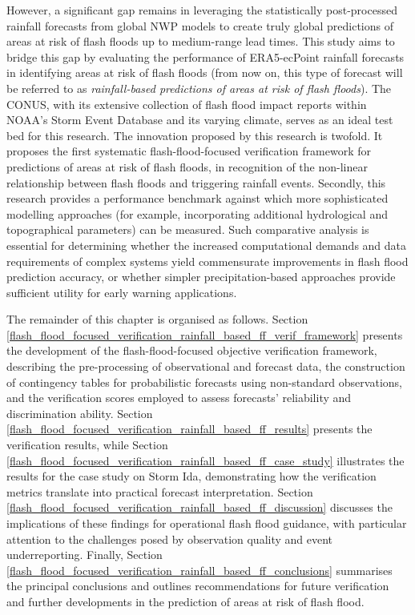 However,  a significant gap remains in leveraging the statistically post-processed rainfall forecasts from global NWP models to create truly global predictions of areas at risk of flash floods up to medium-range lead times. This study aims to bridge this gap by evaluating the performance of ERA5-ecPoint rainfall forecasts in identifying areas at risk of flash floods (from now on, this type of forecast will be referred to as \textit{rainfall-based predictions of areas at risk of flash floods}). The CONUS, with its extensive collection of flash flood impact reports within NOAA's Storm Event Database and its varying climate, serves as an ideal test bed for this research. The innovation proposed by this research is twofold. It proposes the first systematic flash-flood-focused verification framework for predictions of areas at risk of flash floods, in recognition of the non-linear relationship between flash floods and triggering rainfall events. Secondly, this research provides a performance benchmark against which more sophisticated modelling approaches (for example, incorporating additional hydrological and topographical parameters) can be measured. Such comparative analysis is essential for determining whether the increased computational demands and data requirements of complex systems yield commensurate improvements in flash flood prediction accuracy, or whether simpler precipitation-based approaches provide sufficient utility for early warning applications.

The  remainder of this chapter is organised as follows. Section \ref{flash_flood_focused_verification_rainfall_based_ff_verif_framework} presents the development of the flash-flood-focused objective verification framework, describing the pre-processing of observational and forecast data, the construction of contingency tables for probabilistic forecasts using non-standard observations, and the verification scores employed to assess forecasts' reliability and discrimination ability. Section \ref{flash_flood_focused_verification_rainfall_based_ff_results} presents the verification results, while Section \ref{flash_flood_focused_verification_rainfall_based_ff_case_study} illustrates the results for the case study on Storm Ida, demonstrating how the verification metrics translate into practical forecast interpretation. Section \ref{flash_flood_focused_verification_rainfall_based_ff_discussion} discusses the implications of these findings for operational flash flood guidance, with particular attention to the challenges posed by observation quality and event underreporting. Finally, Section \ref{flash_flood_focused_verification_rainfall_based_ff_conclusions} summarises the principal conclusions and outlines recommendations for future verification and further developments in the prediction of areas at risk of flash flood.


